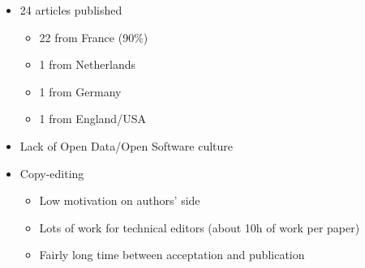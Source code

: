 \documentclass[10pt,compress,serif]{beamer}
\begin{document}
\begin{frame}[t]
 \vskip0.6cm
 \begin{itemize}
  \item 24 articles published
   \begin{itemize}
   \item 22 from France (90\%)
   \item 1 from Netherlands
   \item 1 from Germany
   \item 1 from England/USA
   \end{itemize}
  \item Lack of Open Data/Open Software culture
  \item Copy-editing
 \begin{itemize}
  \item Low motivation on authors' side
  \item Lots of work for technical editors (about 10h of work per paper)
  \item Fairly long time between acceptation and publication 
 \end{itemize}
 \end{itemize}
\end{frame}



\end{document}
